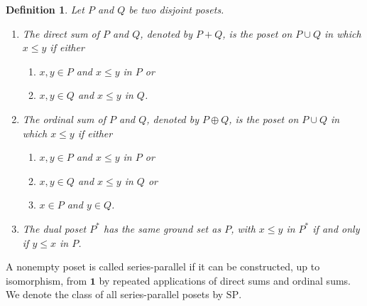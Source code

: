 \documentclass[11pt,a4paper]{article}
\newtheorem{definition}{Definition}[section]
\begin{document}
\begin{definition}\label{def:poset-sums-dual}
Let $P$ and $Q$ be two disjoint posets.
\begin{enumerate}
\item The direct sum of $P$ and $Q$, denoted by $P+Q$, is the poset
on $P\cup Q$ in which $x\le y$ if either
\begin{enumerate}
    \item[\textup{(i)}] $x,y\in P$ and $x\le y$ in $P$ or
    \item[\textup{(ii)}] $x,y\in Q$ and $x\le y$ in $Q$.
\end{enumerate}

\item The ordinal sum of $P$ and $Q$, denoted by $P\oplus Q$, is the poset
on $P\cup Q$ in which $x\le y$ if either
\begin{enumerate}
    \item[\textup{(i)}] $x,y\in P$ and $x\le y$ in $P$ or
    \item[\textup{(ii)}] $x,y\in Q$ and $x\le y$ in $Q$ or
    \item[\textup{(iii)}] $x\in P$ and $y\in Q$.
\end{enumerate}

\item The dual poset $P^*$ has the same ground set as $P$, with
$x\le y$ in $P^*$ if and only if $y\le x$ in $P$.
\end{enumerate}
\end{definition}



A nonempty poset is called series-parallel if it can be constructed,
up to isomorphism, from $\mathbf1$ by repeated applications of direct sums
and ordinal sums.
We denote the class of all series-parallel posets by $\mathrm{SP}$.
\end{document}
